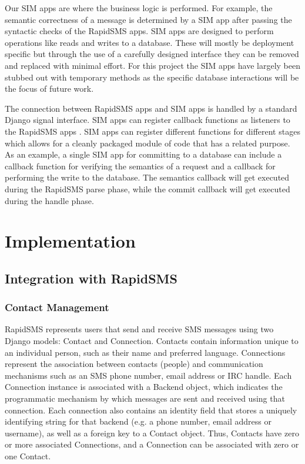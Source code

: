 \documentclass{acm_proc_article-sp}
\begin{document}
Our SIM apps are where the business logic is performed. For example, the semantic correctness of a message is determined by a SIM app after passing the syntactic checks of the RapidSMS apps. SIM apps are designed to perform operations like reads and writes to a database. These will mostly be deployment specific but through the use of a carefully designed interface they can be removed and replaced with minimal effort. For this project the SIM apps have largely been stubbed out with temporary methods as the specific database interactions will be the focus of future work.

The connection between RapidSMS apps and SIM apps is handled by a standard Django signal interface. SIM apps can register callback functions as listeners to the RapidSMS apps \cite{django:signals}. SIM apps can register different functions for different stages which allows for a cleanly packaged module of code that has a related purpose. As an example, a single SIM app for committing to a database can include a callback function for verifying the semantics of a request and a callback for performing the write to the database. The semantics callback will get executed during the RapidSMS parse phase, while the commit callback will get executed during the handle phase.

\section{Implementation}

\subsection{Integration with RapidSMS}

\subsubsection{Contact Management}

RapidSMS represents users that send and receive SMS messages using two Django models: Contact and Connection. Contacts contain information unique to an individual person, such as their name and preferred language. Connections represent the association between contacts (people) and communication mechanisms such as an SMS phone number, email address or IRC handle. Each Connection instance is associated with a Backend object, which indicates the programmatic mechanism by which messages are sent and received using that connection. Each connection also contains an identity field that stores a uniquely identifying string for that backend (e.g. a phone number, email address or username), as well as a foreign key to a Contact object. Thus, Contacts have zero or more associated Connections, and a Connection can be associated with zero or one Contact.
\end{document}
